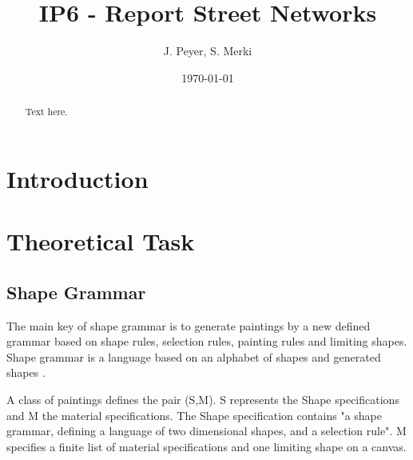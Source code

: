 \documentclass[11pt, a4paper]{report}
\begin{document}
\begin{titlepage}
    \title{IP6 - Report Street Networks}
    \date{\today}
    \author{J. Peyer, S. Merki}
    \maketitle
\end{titlepage}
\setcounter{page}{1}

\tableofcontents



\begin{abstract}
    Text here.
\end{abstract}

\chapter{Introduction}

\chapter{Theoretical Task}
\section{Shape Grammar}
The main key of shape grammar is to generate paintings by a new defined grammar based on shape rules, selection rules, painting rules and limiting shapes. Shape grammar is a language based on an alphabet of shapes and generated shapes \citep{shapeGrammars:1972}. 

A class of paintings defines the pair (S,M). S represents the Shape specifications and M the material specifications. The Shape specification contains "a shape grammar, defining a language of two dimensional shapes, and a selection rule". M specifies a finite list of material specifications and one limiting shape on a canvas.
\end{document}
